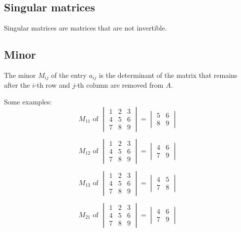 \documentclass[11pt]{article}
\begin{document}
 \newpage
\subsection{Singular matrices}
\label{sec:org9404bf9}
Singular matrices are matrices that are not invertible.
\subsection{Minor}
\label{sec:org6074456}
The minor \(M_{ij}\) of the entry \(a_{ij}\) is the determinant of the matrix that remains after the \(i\)-th row and \(j\)-th column are removed from \(A\).


Some examples:
\begin{displaymath}
M_{11} \text{ of }
\begin{vmatrix}
1 & 2 & 3 \\
4 & 5 & 6 \\
7 & 8 & 9
\end{vmatrix} = \begin{vmatrix}
5 & 6 \\
8 & 9
\end{vmatrix}
\end{displaymath}

\begin{displaymath}
M_{12} \text{ of }
\begin{vmatrix}
1 & 2 & 3 \\
4 & 5 & 6 \\
7 & 8 & 9
\end{vmatrix} = \begin{vmatrix}
4 & 6 \\
7 & 9
\end{vmatrix}
\end{displaymath}

\begin{displaymath}
M_{13} \text{ of }
\begin{vmatrix}
1 & 2 & 3 \\
4 & 5 & 6 \\
7 & 8 & 9
\end{vmatrix} = \begin{vmatrix}
4 & 5 \\
7 & 8
\end{vmatrix}
\end{displaymath}

\begin{displaymath}
M_{21} \text{ of }
\begin{vmatrix}
1 & 2 & 3 \\
4 & 5 & 6 \\
7 & 8 & 9
\end{vmatrix} = \begin{vmatrix}
4 & 6 \\
7 & 9
\end{vmatrix}
\end{displaymath}
\end{document}
